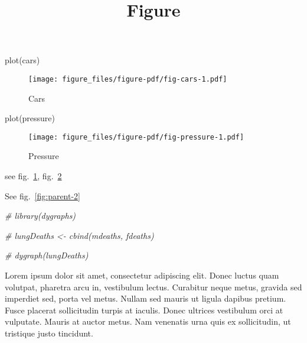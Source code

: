 \documentclass[
]{article}
\title{Figure}
\author{}
\date{}
\newenvironment{Shaded}{}{}
\newcommand{\CommentTok}[1]{\textcolor[rgb]{0.38,0.63,0.69}{\textit{#1}}}
\newcommand{\FunctionTok}[1]{\textcolor[rgb]{0.02,0.16,0.49}{#1}}
\newcommand{\NormalTok}[1]{#1}
\begin{document}
\maketitle

\begin{Shaded}
\begin{Highlighting}[]
\FunctionTok{plot}\NormalTok{(cars)}
\end{Highlighting}
\end{Shaded}

\begin{figure}
\hypertarget{fig:cars}{%
\centering
\texttt{[image: figure\_files/figure-pdf/fig-cars-1.pdf]}
\caption{Cars}\label{fig:cars}
}
\end{figure}

\begin{Shaded}
\begin{Highlighting}[]
\FunctionTok{plot}\NormalTok{(pressure)}
\end{Highlighting}
\end{Shaded}

\begin{figure}
\hypertarget{fig:pressure}{%
\centering
\texttt{[image: figure\_files/figure-pdf/fig-pressure-1.pdf]}
\caption{Pressure}\label{fig:pressure}
}
\end{figure}

see fig.~\ref{fig:cars}, fig.~\ref{fig:pressure}

See fig.~\ref{fig:parent-2}

\begin{Shaded}
\begin{Highlighting}[]
\CommentTok{\# library(dygraphs)}
\end{Highlighting}
\end{Shaded}

\begin{Shaded}
\begin{Highlighting}[]
\CommentTok{\# lungDeaths \textless{}{-} cbind(mdeaths, fdeaths)}
\end{Highlighting}
\end{Shaded}

\begin{Shaded}
\begin{Highlighting}[]
\CommentTok{\# dygraph(lungDeaths)}
\end{Highlighting}
\end{Shaded}

Lorem ipsum dolor sit amet, consectetur adipiscing elit. Donec luctus
quam volutpat, pharetra arcu in, vestibulum lectus. Curabitur neque
metus, gravida sed imperdiet sed, porta vel metus. Nullam sed mauris ut
ligula dapibus pretium. Fusce placerat sollicitudin turpis at iaculis.
Donec ultrices vestibulum orci at vulputate. Mauris at auctor metus. Nam
venenatis urna quis ex sollicitudin, ut tristique justo tincidunt.
\end{document}
